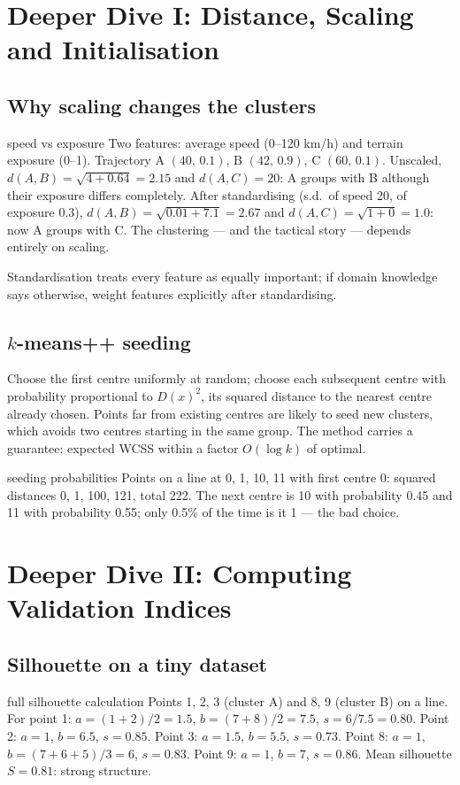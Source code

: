 \documentclass[11pt]{article}
\begin{document}
\section{Deeper Dive I: Distance, Scaling and Initialisation}
\subsection{Why scaling changes the clusters}
\begin{example}{speed vs exposure}
Two features: average speed (0--120 km/h) and terrain exposure (0--1). Trajectory A $(40,\,0.1)$, B $(42,\,0.9)$, C $(60,\,0.1)$. Unscaled, $d(A,B)=\sqrt{4+0.64}=2.15$ and $d(A,C)=20$: A groups with B although their exposure differs completely. After standardising (s.d.\ of speed 20, of exposure 0.3), $d(A,B)=\sqrt{0.01+7.1}=2.67$ and $d(A,C)=\sqrt{1+0}=1.0$: now A groups with C. The clustering --- and the tactical story --- depends entirely on scaling.
\end{example}
Standardisation treats every feature as equally important; if domain knowledge says otherwise, weight features explicitly after standardising.

\subsection{$k$-means++ seeding}
Choose the first centre uniformly at random; choose each subsequent centre with probability proportional to $D(x)^2$, its squared distance to the nearest centre already chosen. Points far from existing centres are likely to seed new clusters, which avoids two centres starting in the same group. The method carries a guarantee: expected WCSS within a factor $O(\log k)$ of optimal.
\begin{example}{seeding probabilities}
Points on a line at 0, 1, 10, 11 with first centre 0: squared distances 0, 1, 100, 121, total 222. The next centre is 10 with probability 0.45 and 11 with probability 0.55; only 0.5\% of the time is it 1 --- the bad choice.
\end{example}

\section{Deeper Dive II: Computing Validation Indices}
\subsection{Silhouette on a tiny dataset}
\begin{example}{full silhouette calculation}
Points 1, 2, 3 (cluster A) and 8, 9 (cluster B) on a line. For point 1: $a=(1+2)/2=1.5$, $b=(7+8)/2=7.5$, $s=6/7.5=0.80$. Point 2: $a=1$, $b=6.5$, $s=0.85$. Point 3: $a=1.5$, $b=5.5$, $s=0.73$. Point 8: $a=1$, $b=(7+6+5)/3=6$, $s=0.83$. Point 9: $a=1$, $b=7$, $s=0.86$. Mean silhouette $S=0.81$: strong structure.
\end{example}
\end{document}
